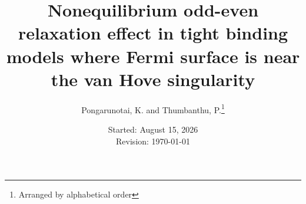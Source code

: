 \documentclass[b5paper, 11pt, openleft]{memoir}
\begin{document}
\thispagestyle{empty}
\title{
  Nonequilibrium odd-even relaxation effect in tight binding models where Fermi surface is near the van Hove singularity
}
\author{Pongarunotai, K. and Thumbanthu, P.\footnote{Arranged by alphabetical order}}
\date{
  Started: August 15, 2026 \\
  Revision: \today
}
\maketitle

\mainmatter

\tableofcontents

% 


\backmatter

\printindex
\printbibliography
\end{document}
